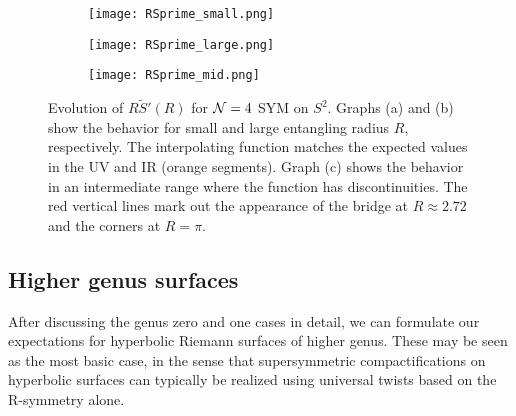 \documentclass[11 pt]{article}
\begin{document}
\begin{figure}
     \centering
     \begin{subfigure}[h!]{0.49\textwidth}
         \centering
         \texttt{[image: RSprime\_small.png]}
         \caption{}
     \end{subfigure}
     \hspace{0 pt}
     \begin{subfigure}[h!]{0.49\textwidth}
         \centering
         \texttt{[image: RSprime\_large.png]}
         \caption{}
     \end{subfigure}
     \begin{subfigure}[h!]{0.49\textwidth}
         \centering
         \texttt{[image: RSprime\_mid.png]}
         \caption{}
     \end{subfigure}
        \caption{Evolution of $R\tilde{S}'(R)$ for ${\cal N}=4$ SYM on $S^2$. Graphs (a) and (b) show the behavior for small and large entangling radius $R$, respectively. The interpolating function matches the expected values in the UV and IR (orange segments). Graph (c) shows the behavior in an intermediate range where the function has discontinuities. The red vertical lines mark out the appearance of the bridge at $R\approx 2.72$ and the corners at $R=\pi.$}
        \label{fig:RSprime}
\end{figure}






\subsection{Higher genus surfaces}\label{sec:higher-genus}

After discussing the genus zero and one cases in detail, we can formulate our expectations for hyperbolic Riemann surfaces of higher genus. These may be seen as the most basic case, in the sense that supersymmetric compactifications on hyperbolic surfaces can typically be realized using universal twists based on the R-symmetry alone. 
\end{document}
